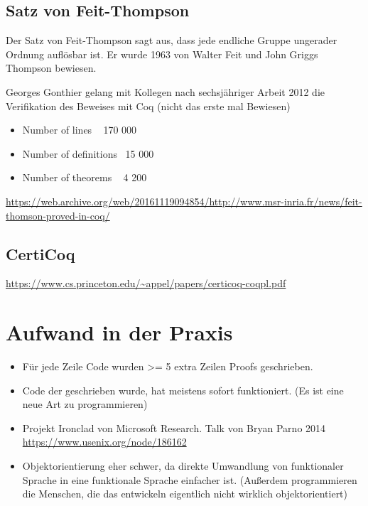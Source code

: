 \subsection{Satz von Feit-Thompson}
Der Satz von Feit-Thompson sagt aus, dass jede endliche Gruppe ungerader Ordnung auflösbar ist. Er wurde 1963 von Walter Feit und John Griggs Thompson bewiesen.

Georges Gonthier gelang mit Kollegen nach sechsjähriger Arbeit 2012 die Verifikation des Beweises mit Coq (nicht das erste mal Bewiesen)
\begin{itemize}
	\item Number of lines ~ 170 000
	\item Number of definitions ~15 000
	\item Number of theorems ~ 4 200
\end{itemize}
\url{https://web.archive.org/web/20161119094854/http://www.msr-inria.fr/news/feit-thomson-proved-in-coq/}
\subsection{CertiCoq}
\url{https://www.cs.princeton.edu/~appel/papers/certicoq-coqpl.pdf}

\section{Aufwand in der Praxis}
\begin{itemize}
	\item Für jede Zeile Code wurden >= 5 extra Zeilen Proofs geschrieben.
	\item Code der geschrieben wurde, hat meistens sofort funktioniert. (Es ist eine neue Art zu programmieren)
	\item Projekt Ironclad von Microsoft Research. Talk von Bryan Parno 2014 \url{https://www.usenix.org/node/186162}
	\item Objektorientierung eher schwer, da direkte Umwandlung von funktionaler Sprache in eine funktionale Sprache einfacher ist. (Außerdem programmieren die Menschen, die das entwickeln eigentlich nicht wirklich objektorientiert)
\end{itemize}


